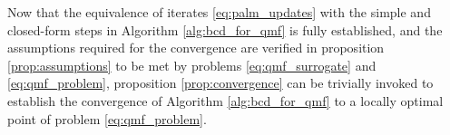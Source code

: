 Now that the equivalence of iterates \eqref{eq:palm_updates} with the simple and closed-form steps in Algorithm \ref{alg:bcd_for_qmf} is fully established, and the assumptions required for the convergence are verified in proposition \ref{prop:assumptions} to be met by problems \eqref{eq:qmf_surrogate} and \eqref{eq:qmf_problem}, proposition \ref{prop:convergence} can be trivially invoked to establish the convergence of Algorithm \ref{alg:bcd_for_qmf} to a locally optimal point of problem \eqref{eq:qmf_problem}.



